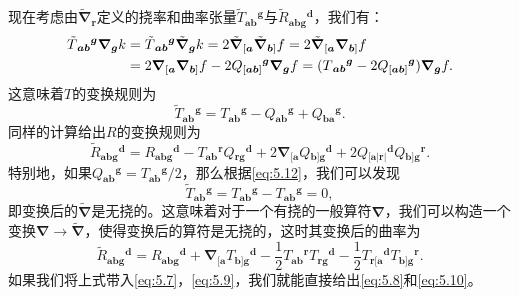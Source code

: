 现在考虑由$\tilde{\boldsymbol{\nabla }}_{\boldsymbol{r}}$定义的挠率和曲率张量$\tilde{T}{_{\boldsymbol{ab}}}^{\boldsymbol{g}}$与$\tilde{R}{_{\boldsymbol{abg}}}^{\boldsymbol{d}}$，我们有：
\begin{equation*}
	\begin{aligned}
		\tilde{T}{_{\boldsymbol{ab}}}^{\boldsymbol{g}}\boldsymbol{\nabla }_{\boldsymbol{g}} k & =\tilde{T}{_{\boldsymbol{ab}}}^{\boldsymbol{g}}\tilde{\boldsymbol{\nabla }}_{\boldsymbol{g}} k=2\tilde{\boldsymbol{\nabla }}_{[\boldsymbol{a}}\tilde{\boldsymbol{\nabla }}_{\boldsymbol{b}]} f=2\tilde{\boldsymbol{\nabla }} \kern+0.01em _{[\boldsymbol{a}}\boldsymbol{\nabla }_{\boldsymbol{b}]} f\\
		& =2\boldsymbol{\nabla }_{[\boldsymbol{a}}\boldsymbol{\nabla }_{\boldsymbol{b}]} f-2Q{_{[\boldsymbol{ab}]}}^{\boldsymbol{g}}\boldsymbol{\nabla }_{\boldsymbol{g}} f=(T{_{\boldsymbol{ab}}}^{\boldsymbol{g}} -2Q{_{[\boldsymbol{ab}]}}^{\boldsymbol{g}} )\boldsymbol{\nabla }_{\boldsymbol{g}} f.
	\end{aligned}
\end{equation*}
这意味着$T$的变换规则为
\begin{equation}
	\tilde{T}{_{\boldsymbol{ab}}}^{\boldsymbol{g}} =T{_{\boldsymbol{ab}}}^{\boldsymbol{g}} -Q{_{\boldsymbol{ab}}}^{\boldsymbol{g}} +Q{_{\boldsymbol{ba}}}^{\boldsymbol{g}} .
	\label{eq:5.12}
\end{equation}
同样的计算给出$R$的变换规则为
\begin{equation*}
	\tilde{R}{_{\boldsymbol{abg}}}^{\boldsymbol{d}} =R{_{\boldsymbol{abg}}}^{\boldsymbol{d}} -T{_{\boldsymbol{ab}}}^{\boldsymbol{r}} Q{_{\boldsymbol{rg}}}^{\boldsymbol{d}} +2\boldsymbol{\nabla }_{[\boldsymbol{a}} Q{_{\boldsymbol{b}]\boldsymbol{g}}}^{\boldsymbol{d}} +2Q{_{[\boldsymbol{a} |\boldsymbol{r} |}}^{\boldsymbol{d}} Q{_{\boldsymbol{b}]\boldsymbol{g}}}^{\boldsymbol{r}} .
\end{equation*}
特别地，如果$Q{_{\boldsymbol{ab}}}^{\boldsymbol{g}} =T{_{\boldsymbol{ab}}}^{\boldsymbol{g}} /2$，那么根据\ref{eq:5.12}，我们可以发现
\begin{equation*}
	\tilde{T}{_{\boldsymbol{ab}}}^{\boldsymbol{g}} =T{_{\boldsymbol{ab}}}^{\boldsymbol{g}} -T{_{\boldsymbol{ab}}}^{\boldsymbol{g}} =0,
\end{equation*}
即变换后的$\tilde{\boldsymbol{\nabla }}$是无挠的。这意味着对于一个有挠的一般算符$\boldsymbol{\nabla }$，我们可以构造一个变换$\boldsymbol{\nabla }\rightarrow \tilde{\boldsymbol{\nabla }}$，使得变换后的算符是无挠的，这时其变换后的曲率为
\begin{equation*}
	\tilde{R}{_{\boldsymbol{abg}}}^{\boldsymbol{d}} =R{_{\boldsymbol{abg}}}^{\boldsymbol{d}} +\boldsymbol{\nabla }_{[\boldsymbol{a}} T{_{\boldsymbol{b}]\boldsymbol{g}}}^{\boldsymbol{d}} -\frac{1}{2} T{_{\boldsymbol{ab}}}^{\boldsymbol{r}} T{_{\boldsymbol{rg}}}^{\boldsymbol{d}} -\frac{1}{2} T{_{\boldsymbol{r}[\boldsymbol{a}}}^{\boldsymbol{d}} T{_{\boldsymbol{b}]\boldsymbol{g}}}^{\boldsymbol{r}} .
\end{equation*}
如果我们将上式带入\ref{eq:5.7}，\ref{eq:5.9}，我们就能直接给出\ref{eq:5.8}和\ref{eq:5.10}。


